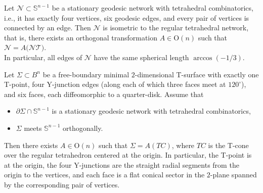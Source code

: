 \documentclass[10pt,a4paper]{amsart}
\begin{document}
\begin{lemma}\label{lem: uniq. of RT-network}
Let $\mathcal{N} \subset \mathbb{S}^{n-1}$ be a stationary geodesic network with tetrahedral combinatorics, i.e., it has exactly four vertices, six geodesic edges, and every pair of vertices is connected by an edge. Then $\mathcal{N}$ is isometric to the regular tetrahedral network, that is, there exists an orthogonal transformation $A \in \mathrm{O}(n)$ such that
$
\mathcal{N} = A \bigl( \mathcal{NT} \bigr)$.\\
In particular, all edges of $\mathcal{N}$ have the same spherical length $\arccos(-1/3)$.
\end{lemma}

\begin{theorem}
Let \(\Sigma \subset B^n\) be a free-boundary minimal $2$-dimensional T-surface with exactly one T-point, four Y-junction edges (along each of which three faces meet at $120^\circ$), and six faces, each diffeomorphic to a quarter-disk. Assume that
\begin{itemize}
\item \(\partial \Sigma \cap \mathbb{S}^{n-1} \) is a stationary geodesic network with tetrahedral combinatorics,
\item \(\Sigma\) meets \(\mathbb{S}^{n-1}\) orthogonally.
\end{itemize}
Then there exists \(A \in \mathrm{O}(n)\) such that \(\Sigma = A(TC)\), where \(TC\) is the T-cone over the regular tetrahedron centered at the origin. In particular, the T-point is at the origin, the four Y-junctions are the straight radial segments from the origin to the vertices, and each face is a flat conical sector in the $2$-plane spanned by the corresponding pair of vertices.
\end{theorem}
\end{document}

